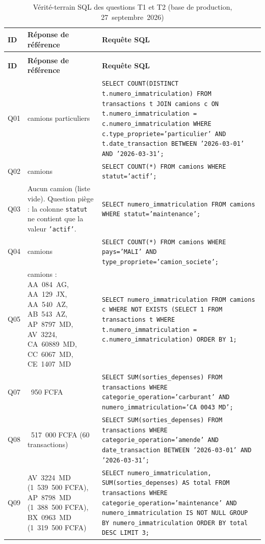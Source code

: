 {\footnotesize
\begin{longtable}{|>{\raggedright\arraybackslash}p{0.8cm}|>{\raggedright\arraybackslash}p{4.2cm}|>{\raggedright\arraybackslash}p{8.8cm}|}
\caption{Vérité-terrain SQL des questions T1 et T2 (base de production, 27~septembre~2026)}
\label{tab:annexe_verite_terrain} \\
\hline
\rowcolor[HTML]{EFEFEF}
\textbf{ID} & \textbf{Réponse de référence} & \textbf{Requête SQL} \\ \hline
\endfirsthead
\multicolumn{3}{c}{\tablename\ \thetable\ (suite)} \\ \hline
\rowcolor[HTML]{EFEFEF}
\textbf{ID} & \textbf{Réponse de référence} & \textbf{Requête SQL} \\ \hline
\endhead
Q01 & 24 camions particuliers & \texttt{SELECT COUNT(DISTINCT t.numero\_immatriculation) FROM transactions t JOIN camions c ON t.numero\_immatriculation = c.numero\_immatriculation WHERE c.type\_propriete='particulier' AND t.date\_transaction BETWEEN '2026-03-01' AND '2026-03-31';} \\ \hline
Q02 & 317 camions & \texttt{SELECT COUNT(*) FROM camions WHERE statut='actif';} \\ \hline
Q03 & Aucun camion (liste vide). Question piège : la colonne \texttt{statut} ne contient que la valeur \texttt{'actif'}. & \texttt{SELECT numero\_immatriculation FROM camions WHERE statut='maintenance';} \\ \hline
Q04 & 110 camions & \texttt{SELECT COUNT(*) FROM camions WHERE pays='MALI' AND type\_propriete='camion\_societe';} \\ \hline
Q05 & 9 camions : AA~084~AG, AA~129~JX, AA~540~AZ, AB~543~AZ, AP~8797~MD, AV~3224, CA~60889~MD, CC~6067~MD, CE~1407~MD & \texttt{SELECT numero\_immatriculation FROM camions c WHERE NOT EXISTS (SELECT 1 FROM transactions t WHERE t.numero\_immatriculation = c.numero\_immatriculation) ORDER BY 1;} \\ \hline
Q07 & 856~950 FCFA & \texttt{SELECT SUM(sorties\_depenses) FROM transactions WHERE categorie\_operation='carburant' AND numero\_immatriculation='CA 0043 MD';} \\ \hline
Q08 & 2~517~000 FCFA (60 transactions) & \texttt{SELECT SUM(sorties\_depenses) FROM transactions WHERE categorie\_operation='amende' AND date\_transaction BETWEEN '2026-03-01' AND '2026-03-31';} \\ \hline
Q09 & AV~3224~MD (1~539~500 FCFA), AP~8798~MD (1~388~500 FCFA), BX~0963~MD (1~319~500 FCFA) & \texttt{SELECT numero\_immatriculation, SUM(sorties\_depenses) AS total FROM transactions WHERE categorie\_operation='maintenance' AND numero\_immatriculation IS NOT NULL GROUP BY numero\_immatriculation ORDER BY total DESC LIMIT 3;} \\ \hline

\end{longtable}}
